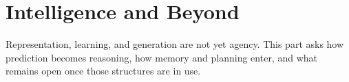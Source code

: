 \part{Intelligence and Beyond}
\label{part:intelligence-and-beyond}

Representation, learning, and generation are not yet agency. This part asks how prediction becomes reasoning, how memory and planning enter, and what remains open once those structures are in use.
